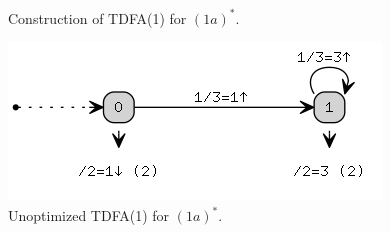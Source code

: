 \documentclass{article}
\theoremstyle{definition}
\begin{document}
\begin{multicols}{2}
\begin{center}
\footnotesize{Construction of TDFA(1) for $(1 a)^*$.} \\
\end{center}
\begin{center}
\includegraphics[width=0.6\linewidth]{img/example6/tdfa1.png}\\
\footnotesize{Unoptimized TDFA(1) for $(1 a)^*$.} \\
\end{center}


\end{multicols}
\end{document}
